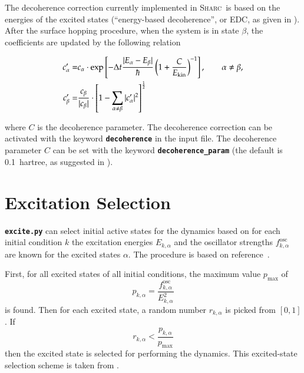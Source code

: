 \documentclass[a4paper,11pt,DIV=15,openany,twoside=false]{scrbook}
\newcommand{\tthdump}[1]{#1}
\newcommand{\sharc}{\textsc{Sharc}}
\newcommand{\ttt}[1]{\textbf{\texttt{#1}}}
\begin{document}
The decoherence correction currently implemented in \sharc\ is based on the energies of the excited states (``energy-based decoherence'', or EDC, as given in \cite{Granucci2010JCP}). After the surface hopping procedure, when the system is in state $\beta$, the coefficients are updated by the following relation
\tthdump{
  \begin{align}
    c_\alpha^\prime=&
    c_\alpha\cdot\exp
    \left[
      -\Delta t\frac{|E_\alpha-E_\beta|}{\hbar}
      \left(
        1+\frac{C}{E_{\text{kin}}}
      \right)^{-1}
    \right],\qquad \alpha\neq\beta,\\
    c_\beta^\prime=&
    \frac{c_\beta}{|c_\beta|}\cdot
    \left[
      1-\sum\limits_{\alpha\neq\beta}^{\vphantom{\alpha}} |c^\prime_\alpha|^2
    \right]^{\frac{1}{2}}
  \end{align}
}
where $C$ is the decoherence parameter. The decoherence correction can be activated with the keyword \ttt{decoherence} in the input file. The decoherence parameter $C$ can be set with the keyword \ttt{decoherence\_param} (the default is 0.1~hartree, as suggested in \cite{Granucci2010JCP}).


\section{Excitation Selection}\label{met:exc_selection}

\ttt{excite.py} can select initial active states for the dynamics based on for each initial condition $k$ the excitation energies $E_{k,\alpha}$ and the oscillator strengths $f^{\text{osc}}_{k,\alpha}$ are known for the excited states $\alpha$. The procedure is based on reference~\cite{Barbatti2011}.

First, for all excited states of all initial conditions, the maximum value $p_{\text{max}}$ of 
\begin{equation}
  p_{k,\alpha}=\frac{f^{\text{osc}}_{k,\alpha}}{E_{k,\alpha}^2} \label{eq:exc_prob}
\end{equation}
is found. Then for each excited state, a random number $r_{k,\alpha}$ is picked from $[0,1]$. If
\begin{equation}
  r_{k,\alpha}<\frac{p_{k,\alpha}}{p_{\text{max}}}
\end{equation}
then the excited state is selected for performing the dynamics. This excited-state selection scheme is taken from \cite{Barbatti2011}.
\end{document}
